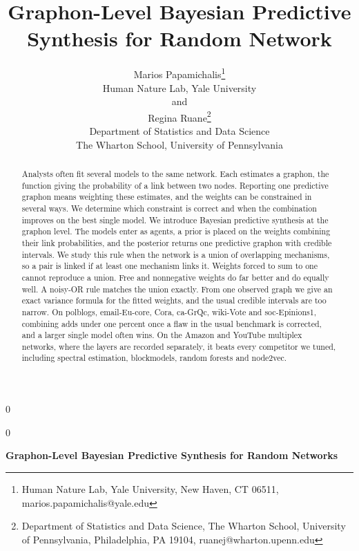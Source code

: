 \documentclass[12pt]{article}
\newcommand{\blind}{0}
\begin{document}
\def\spacingset#1{\renewcommand{\baselinestretch}{#1}\small\normalsize}
\spacingset{1}

\blind
{
  \title{\bf Graphon-Level Bayesian Predictive Synthesis for Random Network}
  \author{Marios Papamichalis\thanks{Human Nature Lab, Yale University, New Haven, CT 06511, marios.papamichalis@yale.edu}
  \hspace{.2cm}\\
  {}Human Nature Lab, Yale University\\
  and \\
  Regina Ruane\thanks{Department of Statistics and Data Science, The Wharton School, University of Pennsylvania, Philadelphia, PA 19104, ruanej@wharton.upenn.edu} \\
  {}Department of Statistics and Data Science\\
  {}The Wharton School, University of Pennsylvania}
  \date{}
  \maketitle
} \fi

\blind
{
  \bigskip
  \bigskip
  \bigskip
  \begin{center}
    {\LARGE\bf Graphon-Level Bayesian Predictive Synthesis for Random Networks}
  \end{center}
  \medskip
} \fi

\bigskip
\begin{abstract}
Analysts often fit several models to the same network. Each estimates a graphon,
the function giving the probability of a link between two nodes. Reporting one
predictive graphon means weighting these estimates, and the weights can be
constrained in several ways. We determine which constraint is correct and when
the combination improves on the best single model. We introduce Bayesian predictive synthesis at the graphon level. The models enter
as agents, a prior is placed on the weights combining their link probabilities,
and the posterior returns one predictive graphon with credible intervals. We
study this rule when the network is a union of overlapping mechanisms, so a pair
is linked if at least one mechanism links it. Weights forced to sum to one cannot
reproduce a union. Free and nonnegative weights do far better and do equally
well. A noisy-OR rule matches the union exactly. From one observed graph we give
an exact variance formula for the fitted weights, and the usual credible
intervals are too narrow. On polblogs, email-Eu-core, Cora, ca-GrQc, wiki-Vote and soc-Epinions1,
combining adds under one percent once a flaw in the usual benchmark is corrected,
and a larger single model often wins. On the Amazon and YouTube multiplex
networks, where the layers are recorded separately, it beats every competitor we
tuned, including spectral estimation, blockmodels, random forests and node2vec.

\end{abstract}
\end{document}
